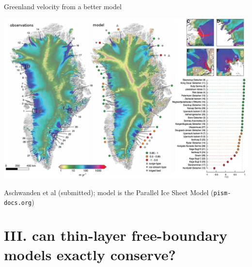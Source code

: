 \documentclass[hide notes,intlimits]{beamer}
\begin{document}
\begin{frame}{Greenland velocity from a better model}
\begin{center}
\includegraphics[width=1.0\textwidth]{greenland-overview-relabel}
\end{center}

\vspace{-5mm}
\tiny Aschwanden et al (submitted); model is the Parallel Ice Sheet Model (\texttt{pism-docs.org})
\end{frame}


\section[conservation w free boundaries?]{III. can thin-layer free-boundary models exactly conserve?}
\end{document}
